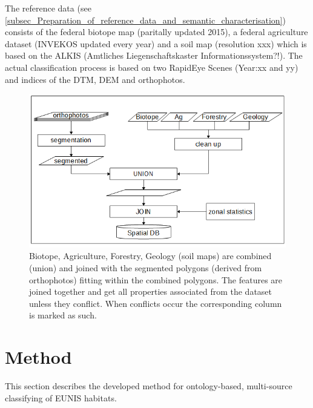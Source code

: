 \documentclass[authoryear, review,12pt,number]{elsarticle}
\begin{document}
The reference data (see
\ref{subsec_Preparation_of_reference_data_and_semantic_characterisation})
consists of the federal biotope map (paritally updated 2015), a federal
agriculture dataset (INVEKOS updated every year) and a soil map (resolution xxx)
which is based on the ALKIS (Amtliches Liegenschaftskaster
Informationssystem?!).
The actual classification process is based on two RapidEye Scenes (Year:xx and
yy) and indices of the DTM, DEM and orthophotos.


\begin{figure} \includegraphics[width=1\textwidth]{diagrams/pre_processing.png}
    \caption{Biotope, Agriculture, Forestry, Geology (soil maps) are combined 
    (union) and joined with the segmented polygons (derived from orthophotos) 
    fitting within the combined polygons. The features are joined together 
    and get all properties associated from the dataset unless they conflict. 
    When conflicts occur the corresponding column is marked as such.}
\label{fig_pre-processing}
\end{figure}

\section{Method}
This section describes the developed method for ontology-based, multi-source
classifying of EUNIS habitats.
\label{subsec_method_overview}
\end{document}
